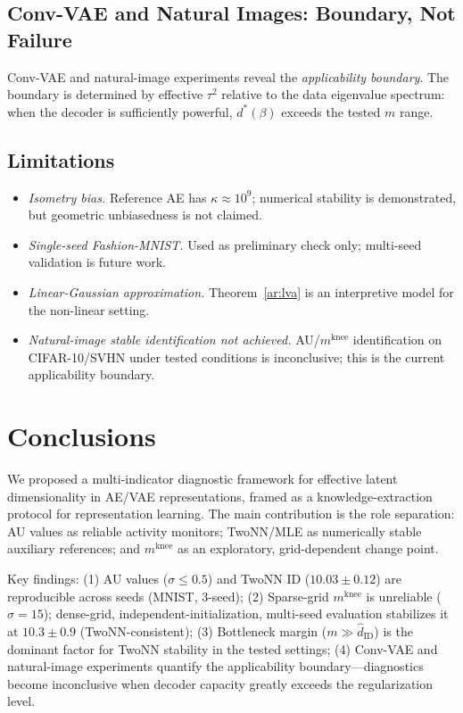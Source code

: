 \documentclass[make,article,submit,pdftex,moreauthors]{Definitions/mdpi}
\newcommand{\kap}{\kappa}
\newcommand{\mknee}{m^{\mathrm{knee}}}
\newcommand{\hatdID}{\hat{d}_{\mathrm{ID}}}
\begin{document}
\subsection{Conv-VAE and Natural Images: Boundary, Not Failure}

Conv-VAE and natural-image experiments reveal the \emph{applicability boundary}.
The boundary is determined by effective $\tau^2$ relative to the data
eigenvalue spectrum: when the decoder is sufficiently powerful,
$d^*(\beta)$ exceeds the tested $m$ range.

\subsection{Limitations}

\begin{itemize}
\item \emph{Isometry bias.}
Reference AE has $\kap \approx 10^9$; numerical stability is demonstrated,
but geometric unbiasedness is not claimed.
\item \emph{Single-seed Fashion-MNIST.}
Used as preliminary check only; multi-seed validation is future work.
\item \emph{Linear-Gaussian approximation.}
Theorem~\ref{ar:lva} is an interpretive model for the non-linear setting.
\item \emph{Natural-image stable identification not achieved.}
AU/$\mknee$ identification on CIFAR-10/SVHN under tested conditions is
inconclusive; this is the current applicability boundary.
\end{itemize}

\section{Conclusions}\label{sec:conclusion}

We proposed a multi-indicator diagnostic framework for effective latent
dimensionality in AE/VAE representations, framed as a knowledge-extraction
protocol for representation learning.
The main contribution is the role separation: AU values as reliable activity
monitors; TwoNN/MLE as numerically stable auxiliary references; and $\mknee$
as an exploratory, grid-dependent change point.

Key findings:
(1) AU values ($\sigma \leq 0.5$) and TwoNN ID ($10.03 \pm 0.12$) are
reproducible across seeds (MNIST, 3-seed);
(2) Sparse-grid $\mknee$ is unreliable ($\sigma = 15$); dense-grid,
independent-initialization, multi-seed evaluation stabilizes it at
$10.3 \pm 0.9$ (TwoNN-consistent);
(3) Bottleneck margin ($m \gg \hatdID$) is the dominant factor for TwoNN
stability in the tested settings;
(4) Conv-VAE and natural-image experiments quantify the applicability
boundary---diagnostics become inconclusive when decoder capacity greatly
exceeds the regularization level.
\end{document}
